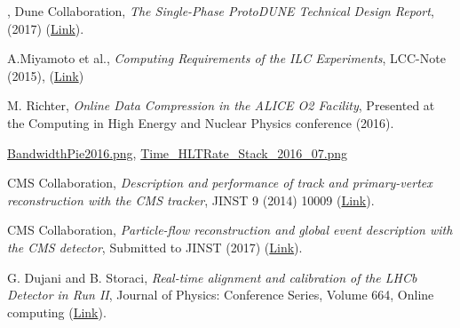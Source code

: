 \documentclass[11pt,letterpaper,fleqn]{article}
\begin{document}
\begin{thebibliography}{99}
, 
Dune Collaboration, 
\textit{The Single-Phase ProtoDUNE Technical Design Report},
(2017) (\href{https://arxiv.org/abs/1706.07081}{Link}). 

A.Miyamoto et al., 
\textit{Computing Requirements of the ILC Experiments}, 
LCC-Note (2015), (\href{http://www-jlc.kek.jp/~miyamoto/SoftwareCommonTask/docs/ILCComputing-EDMS1130485.A.1.1.pdf}{Link})

M. Richter, 
\textit{Online Data Compression in the ALICE O2 Facility}, 
Presented at the Computing in High Energy and Nuclear Physics conference (2016).

\href{https://twiki.cern.ch/twiki/pub/.../BandwidthPie2016.png}{BandwidthPie2016.png}, 
\href{https://twiki.cern.ch/twiki/pub/.../Time\_HLTRate\_Stack\_2016\_07.png}{Time\_HLTRate\_Stack\_2016\_07.png}

CMS Collaboration, 
\textit{Description and performance of track and primary-vertex reconstruction with the CMS tracker},  
JINST 9 (2014) 10009 (\href{http://cds.cern.ch/record/1704291}{Link}). 

CMS Collaboration, 
\textit{Particle-flow reconstruction and global event description with the CMS detector}, 
Submitted to JINST (2017) (\href{https://arxiv.org/abs/1706.04965}{Link}).

G. Dujani and B. Storaci, 
\textit{Real-time alignment and calibration of the LHCb Detector in Run II}, 
Journal of Physics: Conference Series, Volume 664, Online computing (\href{https://cds.cern.ch/record/2017839?ln=en}{Link}).

 










\end{thebibliography}


\end{document}
